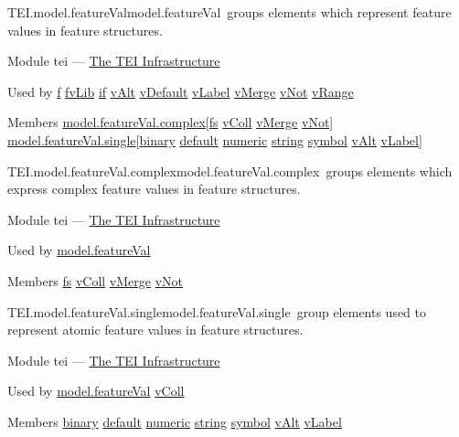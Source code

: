 \begin{reflist}
\item[]\begin{specHead}{TEI.model.featureVal}{model.featureVal} groups elements which represent feature values in feature structures.\end{specHead} 
    \item[{Module}]
  tei — \hyperref[ST]{The TEI Infrastructure}
    \item[{Used by}]
  \hyperref[TEI.f]{f} \hyperref[TEI.fvLib]{fvLib} \hyperref[TEI.if]{if} \hyperref[TEI.vAlt]{vAlt} \hyperref[TEI.vDefault]{vDefault} \hyperref[TEI.vLabel]{vLabel} \hyperref[TEI.vMerge]{vMerge} \hyperref[TEI.vNot]{vNot} \hyperref[TEI.vRange]{vRange}
    \item[{Members}]
  \hyperref[TEI.model.featureVal.complex]{model.featureVal.complex}[\hyperref[TEI.fs]{fs} \hyperref[TEI.vColl]{vColl} \hyperref[TEI.vMerge]{vMerge} \hyperref[TEI.vNot]{vNot}] \hyperref[TEI.model.featureVal.single]{model.featureVal.single}[\hyperref[TEI.binary]{binary} \hyperref[TEI.default]{default} \hyperref[TEI.numeric]{numeric} \hyperref[TEI.string]{string} \hyperref[TEI.symbol]{symbol} \hyperref[TEI.vAlt]{vAlt} \hyperref[TEI.vLabel]{vLabel}]
\end{reflist}  
\begin{reflist}
\item[]\begin{specHead}{TEI.model.featureVal.complex}{model.featureVal.complex} groups elements which express complex feature values in feature structures.\end{specHead} 
    \item[{Module}]
  tei — \hyperref[ST]{The TEI Infrastructure}
    \item[{Used by}]
  \hyperref[TEI.model.featureVal]{model.featureVal}
    \item[{Members}]
  \hyperref[TEI.fs]{fs} \hyperref[TEI.vColl]{vColl} \hyperref[TEI.vMerge]{vMerge} \hyperref[TEI.vNot]{vNot}
\end{reflist}  
\begin{reflist}
\item[]\begin{specHead}{TEI.model.featureVal.single}{model.featureVal.single} group elements used to represent atomic feature values in feature structures.\end{specHead} 
    \item[{Module}]
  tei — \hyperref[ST]{The TEI Infrastructure}
    \item[{Used by}]
  \hyperref[TEI.model.featureVal]{model.featureVal} \hyperref[TEI.vColl]{vColl}
    \item[{Members}]
  \hyperref[TEI.binary]{binary} \hyperref[TEI.default]{default} \hyperref[TEI.numeric]{numeric} \hyperref[TEI.string]{string} \hyperref[TEI.symbol]{symbol} \hyperref[TEI.vAlt]{vAlt} \hyperref[TEI.vLabel]{vLabel}
\end{reflist}  
